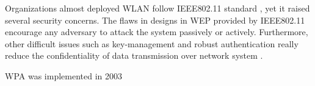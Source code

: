 Organizations almost deployed \ac{WLAN} follow \ac{IEEE}802.11 standard \cite{ieee1999802}, yet it raised several security concerns. The flaws in designs in \ac{WEP} provided by \ac{IEEE}802.11 encourage any adversary to attack the system passively or actively. Furthermore, other difficult issues such as key-management and robust authentication really reduce the confidentiality of data transmission over network system \cite{arbaugh2002your}.

\ac{WPA} was implemented in 2003 \cite{fitzpatrick_2016}

